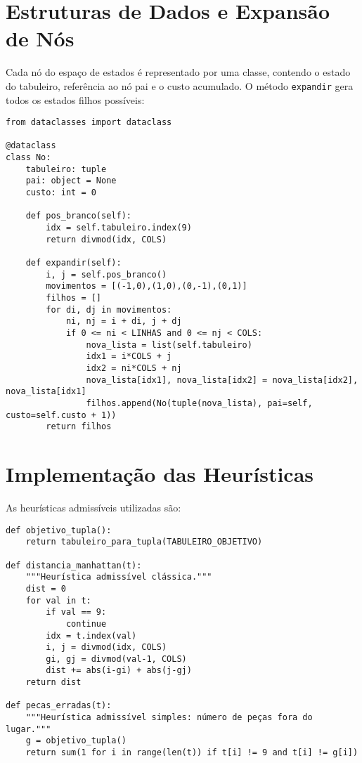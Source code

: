 \section{Estruturas de Dados e Expansão de Nós}  
  
Cada nó do espaço de estados é representado por uma classe, contendo o estado do tabuleiro, referência ao nó pai e o custo acumulado. O método \texttt{expandir} gera todos os estados filhos possíveis:  
  
\begin{verbatim}  
from dataclasses import dataclass  
  
@dataclass  
class No:  
    tabuleiro: tuple  
    pai: object = None  
    custo: int = 0  
  
    def pos_branco(self):  
        idx = self.tabuleiro.index(9)  
        return divmod(idx, COLS)  
  
    def expandir(self):  
        i, j = self.pos_branco()  
        movimentos = [(-1,0),(1,0),(0,-1),(0,1)]  
        filhos = []  
        for di, dj in movimentos:  
            ni, nj = i + di, j + dj  
            if 0 <= ni < LINHAS and 0 <= nj < COLS:  
                nova_lista = list(self.tabuleiro)  
                idx1 = i*COLS + j  
                idx2 = ni*COLS + nj  
                nova_lista[idx1], nova_lista[idx2] = nova_lista[idx2], nova_lista[idx1]  
                filhos.append(No(tuple(nova_lista), pai=self, custo=self.custo + 1))  
        return filhos  
\end{verbatim}  
  
\section{Implementação das Heurísticas}  
  
As heurísticas admissíveis utilizadas são:  
  
\begin{verbatim}  
def objetivo_tupla():  
    return tabuleiro_para_tupla(TABULEIRO_OBJETIVO)  
  
def distancia_manhattan(t):  
    """Heurística admissível clássica."""  
    dist = 0  
    for val in t:  
        if val == 9:  
            continue  
        idx = t.index(val)  
        i, j = divmod(idx, COLS)  
        gi, gj = divmod(val-1, COLS)  
        dist += abs(i-gi) + abs(j-gj)  
    return dist  
  
def pecas_erradas(t):  
    """Heurística admissível simples: número de peças fora do lugar."""  
    g = objetivo_tupla()  
    return sum(1 for i in range(len(t)) if t[i] != 9 and t[i] != g[i])  
\end{verbatim}  
  

